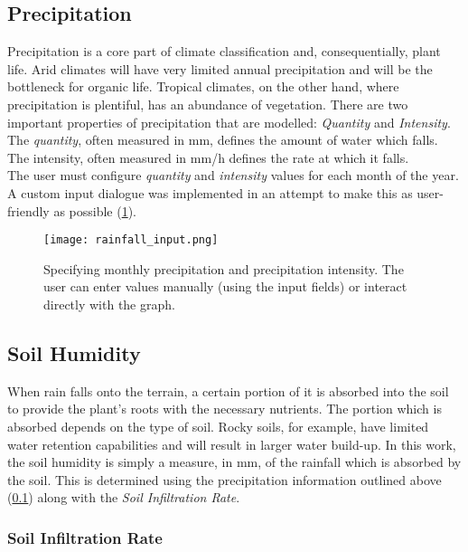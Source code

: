 \subsection{Precipitation} \label{sec:precipitation}

Precipitation is a core part of climate classification and, consequentially, plant life. Arid climates will have very limited annual precipitation and will be the bottleneck for organic life. Tropical climates, on the other hand, where precipitation is plentiful, has an abundance of vegetation. There are two important properties of precipitation that are modelled: \textit{Quantity} and \textit{Intensity}. The \textit{quantity}, often measured in mm, defines the amount of water which falls. The intensity, often measured in mm/h defines the rate at which it falls.\\

The user must configure \textit{quantity} and \textit{intensity} values for each month of the year. A custom input dialogue was implemented in an attempt to make this as user-friendly as possible (\ref{fig:rainfall_input}).

\begin{figure}
\center
	\texttt{[image: rainfall\_input.png]}
	\caption{ Specifying monthly precipitation and precipitation intensity. The user can enter values manually (using the input fields) or interact directly with the graph.}
	\label{fig:rainfall_input}
\end{figure}

\subsection{Soil Humidity}

When rain falls onto the terrain, a certain portion of it is absorbed into the soil to provide the plant's roots with the necessary nutrients. The portion which is absorbed depends on the type of soil. Rocky soils, for example, have limited water retention capabilities and will result in larger water build-up. In this work, the soil humidity is simply a measure, in mm, of the rainfall which is absorbed by the soil. This is determined using the precipitation information outlined above (\ref{sec:precipitation}) along with the \textit{Soil Infiltration Rate}.

\subsubsection{Soil Infiltration Rate}


